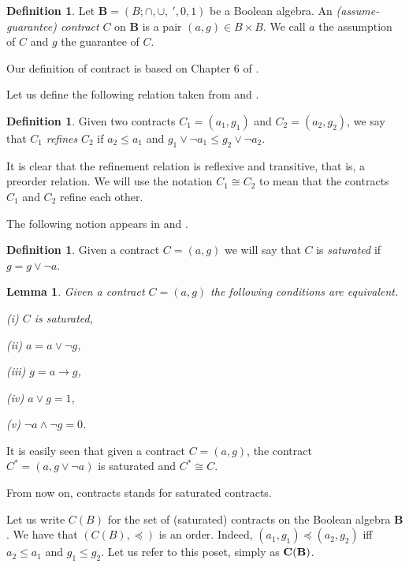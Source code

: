 \documentclass[a4paper,11pt]{article}
\newtheorem{lem}[theorem]{Lemma}
\theoremstyle{definition}
\newtheorem{defn}[theorem]{Definition}
\newcommand{\cb}{\bf{C(B)}}
\newcommand{\cbs}{C(B)}
\begin{document}
\begin{defn} \label{contract}
Let $\mathbf{B} = (B; \cap, \cup,\ ', 0, 1)$ be a Boolean algebra. 
An \emph{(assume-guarantee) contract} $C$ on $\mathbf{B}$ is a pair $(a, g) \in B \times B$.
We call $a$ the assumption of $C$ and $g$ the guarantee of $C$. 
\end{defn}

Our definition of contract is based on Chapter 6 of \cite{IR}. 

Let us define the following relation taken from \cite[p. 147]{BCNP} and \cite[p. 19]{IR}. 

\begin{defn}
Given two contracts $C_1 = (a_1, g_1)$ and $C_2 = (a_2,g_2)$, we say that $C_1$ \emph{refines} $C_2$ if $a_2 \leq a_1$ and $g_1 \vee \neg a_1 \leq g_2 \vee \neg a_2$.
\end{defn}

It is clear that the refinement relation is reflexive and transitive, that is, a preorder relation.
We will use the notation $C_1 \cong C_2$ to mean that the contracts $C_1$ and $C_2$ refine each other.

The following notion appears in \cite[p. 185]{BCNP} and \cite[p. 19]{IR}.

\begin{defn}
Given a contract $C = (a, g)$ we will say that $C$ is \emph{saturated} if $g = g \vee \neg a$.
\end{defn}

\begin{lem}
Given a contract $C = (a, g)$ the following conditions are equivalent.

(i) $C$ is saturated,

(ii) $a = a \vee \neg g$,

(iii) $g = a \to g$,

(iv) $a \vee g = 1$,

(v) $\neg a \wedge \neg g = 0$.
\end{lem}

It is easily seen that given a contract $C = (a, g)$, the contract $C^*= (a, g \vee \neg a)$ is saturated and $C^* \cong C$.

From now on, contracts stands for saturated contracts.

Let us write $\cbs$ for the set of (saturated) contracts on the Boolean algebra $\mathbf{B}$. 
We have that $(\cbs, \preceq)$ is an order.
Indeed, $(a_1,g_1) \preceq (a_2,g_2)$ iff $a_2 \leq a_1$ and $g_1 \leq g_2$.
Let us refer to this poset, simply as $\cb$. 
\end{document}
